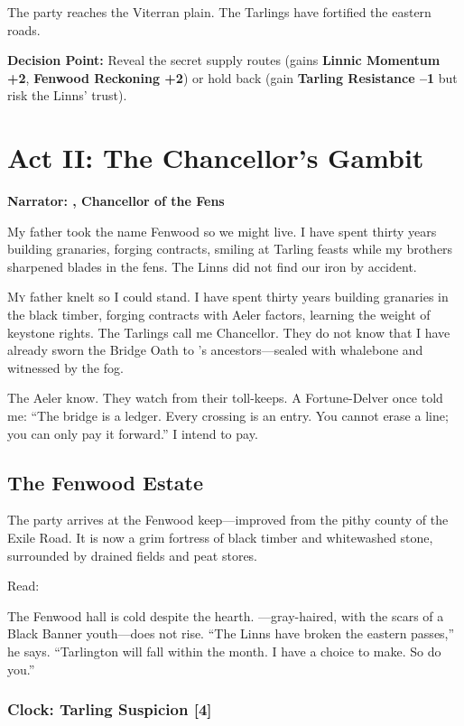 \documentclass[11pt,a5paper]{book}
\newcommand{\timer}[1]{\textbf{[#1]}}
\begin{document}
The party reaches the Viterran plain. The Tarlings have fortified the eastern roads. 

\textbf{Decision Point:} Reveal the secret supply routes (gains \textbf{Linnic Momentum +2}, \textbf{Fenwood Reckoning +2}) or hold back (gain \textbf{Tarling Resistance --1} but risk the Linns' trust).

\clearpage

\chapter{Act II: The Chancellor's Gambit}
\textbf{Narrator: \aldric, Chancellor of the Fens}

\epigraph{My father took the name Fenwood so we might live. I have spent thirty years building granaries, forging contracts, smiling at Tarling feasts while my brothers sharpened blades in the fens. The Linns did not find our iron by accident.}{\aldric}

\lettrine{M}{y} father knelt so I could stand. I have spent thirty years building granaries in the black timber, forging contracts with Aeler factors, learning the weight of keystone rights. The Tarlings call me Chancellor. They do not know that I have already sworn the Bridge Oath to \soren's ancestors---sealed with whalebone and witnessed by the fog.

The Aeler know. They watch from their toll-keeps. A Fortune-Delver once told me: ``The bridge is a ledger. Every crossing is an entry. You cannot erase a line; you can only pay it forward.'' I intend to pay.

\section*{The Fenwood Estate}

The party arrives at the Fenwood keep---improved from the pithy county of the Exile Road. It is now a grim fortress of black timber and whitewashed stone, surrounded by drained fields and peat stores.

Read:
\begin{quoting}
The Fenwood hall is cold despite the hearth. \aldric{}---gray-haired, with the scars of a Black Banner youth---does not rise. ``The Linns have broken the eastern passes,'' he says. ``Tarlington will fall within the month. I have a choice to make. So do you.''
\end{quoting}

\subsection*{Clock: Tarling Suspicion \timer{4}}
\end{document}
